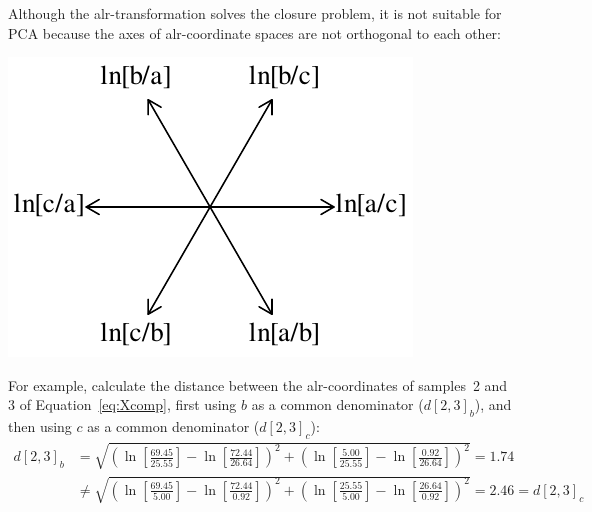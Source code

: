 Although the alr-transformation solves the closure problem, it is not
suitable for PCA because the axes of alr-coordinate spaces are not
orthogonal to each other:

\noindent\begin{minipage}[t][][b]{.3\textwidth}
\includegraphics[]{../figures/alraxes.pdf}\medskip
\end{minipage}
\begin{minipage}[t][][t]{.7\textwidth}
  \label{fig:alraxes}
\end{minipage}

For example, calculate the distance between the alr-coordinates of
samples~2 and 3 of Equation~\ref{eq:Xcomp}, first using $b$ as a
common denominator ($d[2,3]_b$), and then using $c$ as a common
denominator ($d[2,3]_c$):
\begin{equation*}
  \begin{split}
    d[2,3]_b & =
    \sqrt{
      \left(
      \ln\!\left[\frac{69.45}{25.55}\right]-
      \ln\!\left[\frac{72.44}{26.64}\right]
      \right)^2 +
      \left(
      \ln\!\left[\frac{5.00}{25.55}\right]-
      \ln\!\left[\frac{0.92}{26.64}\right]
      \right)^2
    } = 1.74\\
    & \neq 
    \sqrt{
      \left(
      \ln\!\left[\frac{69.45}{5.00}\right]-
      \ln\!\left[\frac{72.44}{0.92}\right]
      \right)^2 +
      \left(
      \ln\!\left[\frac{25.55}{5.00}\right]-
      \ln\!\left[\frac{26.64}{0.92}\right]
      \right)^2
    } = 2.46 = d[2,3]_c
  \end{split}
\end{equation*}

